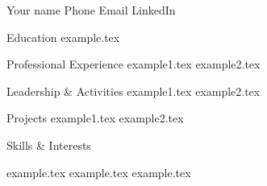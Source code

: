 \documentclass[11pt]{00_template}
\begin{document}
\begin{cv}

\cvheader
{Your name}
{Phone}
{Email}
{LinkedIn}

\begin{cvsection}{Education}
{example.tex}
\end{cvsection}

\begin{cvsection}{Professional Experience}
{example1.tex}
{example2.tex}
\end{cvsection}

\begin{cvsection}{Leadership \& Activities}
{example1.tex}
{example2.tex}
\end{cvsection}

\begin{cvsection}{Projects}
{example1.tex}
{example2.tex}
\end{cvsection}

\begin{cvsection}{Skills \& Interests}
\begin{cvlist}
    {example.tex}
    {example.tex}
    {example.tex}
\end{cvlist}
\end{cvsection}


\end{cv}
\end{document}
